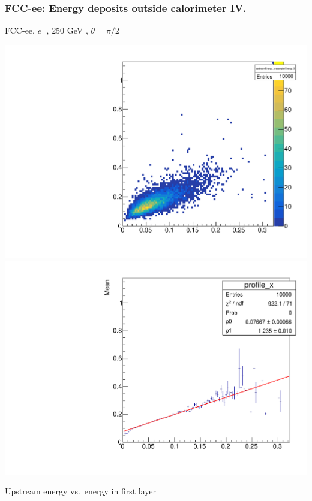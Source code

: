 \documentclass{beamer}
\newcommand{\redtext}[1]{%
  \textcolor{myRed}{#1}
}
\begin{document}
\begin{frame}
  \frametitle{FCC-ee: Energy deposits outside calorimeter IV.}

  \centering
  FCC-ee, $e^{-}$, \redtext{250 GeV}, $\theta = \pi/2$ \\[1.5ex]
  \begin{adjustwidth}{-9mm}{-9mm}
    \includegraphics[width=0.49\linewidth]{figures/upstream/hist_upstream_vs_layer_0_90deg_250GeV.pdf}
    \includegraphics[width=0.49\linewidth]{figures/upstream/profile_upstream_vs_layer_0_90deg_250GeV.pdf}
  \end{adjustwidth}
  \redtext{Upstream} energy vs.\ energy in first layer
\end{frame}
\end{document}

